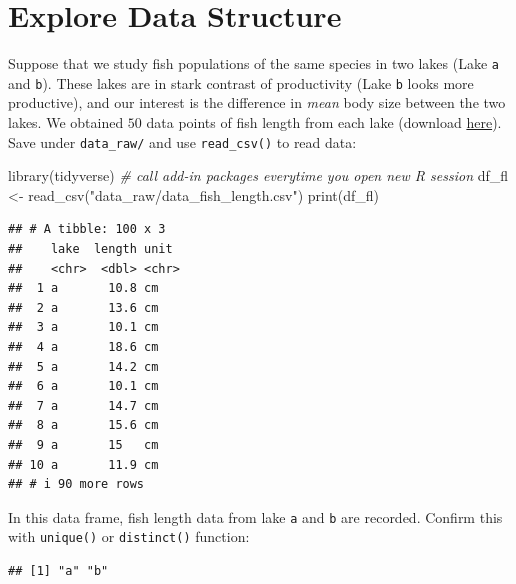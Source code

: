 \documentclass[
]{book}
\newenvironment{Shaded}{\begin{snugshade}}{\end{snugshade}}
\newcommand{\CommentTok}[1]{\textcolor[rgb]{0.56,0.35,0.01}{\textit{#1}}}
\newcommand{\FunctionTok}[1]{\textcolor[rgb]{0.00,0.00,0.00}{#1}}
\newcommand{\NormalTok}[1]{#1}
\newcommand{\OtherTok}[1]{\textcolor[rgb]{0.56,0.35,0.01}{#1}}
\newcommand{\SpecialCharTok}[1]{\textcolor[rgb]{0.00,0.00,0.00}{#1}}
\newcommand{\StringTok}[1]{\textcolor[rgb]{0.31,0.60,0.02}{#1}}
\begin{document}
\hypertarget{explore-data-structure}{%
\section{Explore Data Structure}\label{explore-data-structure}}

Suppose that we study fish populations of the same species in two lakes (Lake \texttt{a} and \texttt{b}). These lakes are in stark contrast of productivity (Lake \texttt{b} looks more productive), and our interest is the difference in \emph{mean} body size between the two lakes. We obtained \(50\) data points of fish length from each lake (download \href{https://github.com/aterui/biostats/blob/master/data_raw/data_fish_length.csv}{here}). Save under \texttt{data\_raw/} and use \texttt{read\_csv()} to read data:

\begin{Shaded}
\begin{Highlighting}[]
\FunctionTok{library}\NormalTok{(tidyverse) }\CommentTok{\# call add{-}in packages everytime you open new R session}
\NormalTok{df\_fl }\OtherTok{\textless{}{-}} \FunctionTok{read\_csv}\NormalTok{(}\StringTok{"data\_raw/data\_fish\_length.csv"}\NormalTok{)}
\FunctionTok{print}\NormalTok{(df\_fl)}
\end{Highlighting}
\end{Shaded}

\begin{verbatim}
## # A tibble: 100 x 3
##    lake  length unit 
##    <chr>  <dbl> <chr>
##  1 a       10.8 cm   
##  2 a       13.6 cm   
##  3 a       10.1 cm   
##  4 a       18.6 cm   
##  5 a       14.2 cm   
##  6 a       10.1 cm   
##  7 a       14.7 cm   
##  8 a       15.6 cm   
##  9 a       15   cm   
## 10 a       11.9 cm   
## # i 90 more rows
\end{verbatim}

In this data frame, fish length data from lake \texttt{a} and \texttt{b} are recorded. Confirm this with \texttt{unique()} or \texttt{distinct()} function:

\begin{Shaded}
\end{Shaded}

\begin{verbatim}
## [1] "a" "b"
\end{verbatim}
\end{document}
